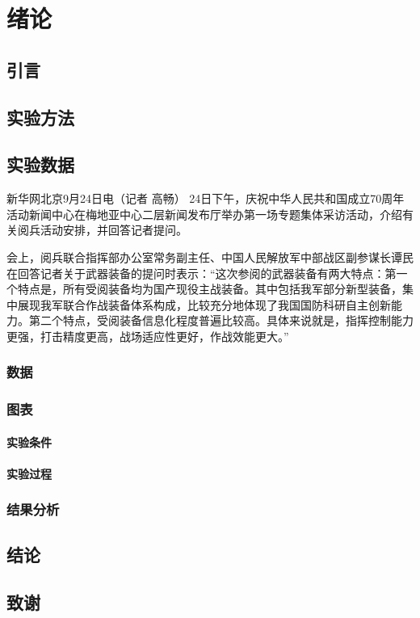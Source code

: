 \documentclass{book}
\begin{document}
\tableofcontents


\chapter{绪论}
\section{引言}

\section{实验方法}
\section{实验数据}
新华网北京9月24日电（记者 高畅） 24日下午，庆祝中华人民共和国成立70周年活动新闻中心在梅地亚中心二层新闻发布厅举办第一场专题集体采访活动，介绍有关阅兵活动安排，并回答记者提问。

会上，阅兵联合指挥部办公室常务副主任、中国人民解放军中部战区副参谋长谭民在回答记者关于武器装备的提问时表示：“这次参阅的武器装备有两大特点：第一个特点是，所有受阅装备均为国产现役主战装备。其中包括我军部分新型装备，集中展现我军联合作战装备体系构成，比较充分地体现了我国国防科研自主创新能力。第二个特点，受阅装备信息化程度普遍比较高。具体来说就是，指挥控制能力更强，打击精度更高，战场适应性更好，作战效能更大。”
\subsection{数据}
\subsection{图表}
\subsubsection{实验条件}
\subsubsection{实验过程}
\subsection{结果分析}
\section{结论}
\section{致谢}
\end{document}
